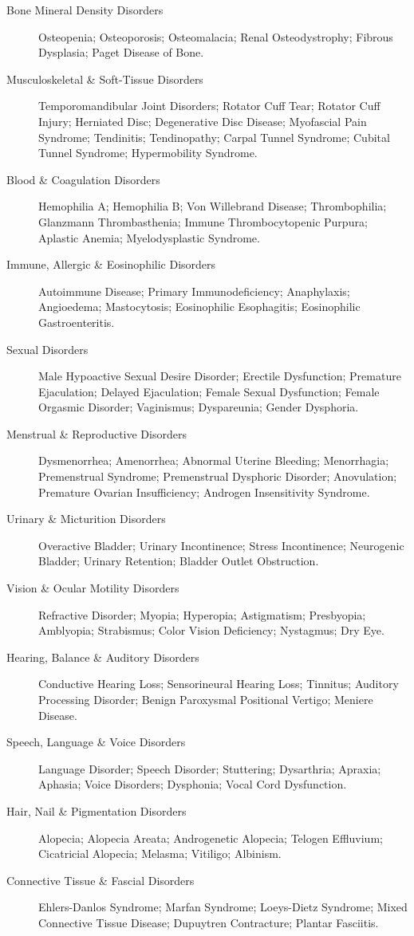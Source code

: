 \begin{description}
\item[Bone Mineral Density Disorders] Osteopenia; Osteoporosis; Osteomalacia; Renal Osteodystrophy; Fibrous Dysplasia; Paget Disease of Bone.

\item[Musculoskeletal \& Soft-Tissue Disorders] Temporomandibular Joint Disorders; Rotator Cuff Tear; Rotator Cuff Injury; Herniated Disc; Degenerative Disc Disease; Myofascial Pain Syndrome; Tendinitis; Tendinopathy; Carpal Tunnel Syndrome; Cubital Tunnel Syndrome; Hypermobility Syndrome.

\item[Blood \& Coagulation Disorders] Hemophilia A; Hemophilia B; Von Willebrand Disease; Thrombophilia; Glanzmann Thrombasthenia; Immune Thrombocytopenic Purpura; Aplastic Anemia; Myelodysplastic Syndrome.

\item[Immune, Allergic \& Eosinophilic Disorders] Autoimmune Disease; Primary Immunodeficiency; Anaphylaxis; Angioedema; Mastocytosis; Eosinophilic Esophagitis; Eosinophilic Gastroenteritis.

\item[Sexual Disorders] Male Hypoactive Sexual Desire Disorder; Erectile Dysfunction; Premature Ejaculation; Delayed Ejaculation; Female Sexual Dysfunction; Female Orgasmic Disorder; Vaginismus; Dyspareunia; Gender Dysphoria.

\item[Menstrual \& Reproductive Disorders] Dysmenorrhea; Amenorrhea; Abnormal Uterine Bleeding; Menorrhagia; Premenstrual Syndrome; Premenstrual Dysphoric Disorder; Anovulation; Premature Ovarian Insufficiency; Androgen Insensitivity Syndrome.

\item[Urinary \& Micturition Disorders] Overactive Bladder; Urinary Incontinence; Stress Incontinence; Neurogenic Bladder; Urinary Retention; Bladder Outlet Obstruction.

\item[Vision \& Ocular Motility Disorders] Refractive Disorder; Myopia; Hyperopia; Astigmatism; Presbyopia; Amblyopia; Strabismus; Color Vision Deficiency; Nystagmus; Dry Eye.

\item[Hearing, Balance \& Auditory Disorders] Conductive Hearing Loss; Sensorineural Hearing Loss; Tinnitus; Auditory Processing Disorder; Benign Paroxysmal Positional Vertigo; Meniere Disease.

\item[Speech, Language \& Voice Disorders] Language Disorder; Speech Disorder; Stuttering; Dysarthria; Apraxia; Aphasia; Voice Disorders; Dysphonia; Vocal Cord Dysfunction.

\item[Hair, Nail \& Pigmentation Disorders] Alopecia; Alopecia Areata; Androgenetic Alopecia; Telogen Effluvium; Cicatricial Alopecia; Melasma; Vitiligo; Albinism.

\item[Connective Tissue \& Fascial Disorders] Ehlers-Danlos Syndrome; Marfan Syndrome; Loeys-Dietz Syndrome; Mixed Connective Tissue Disease; Dupuytren Contracture; Plantar Fasciitis.
\end{description}

